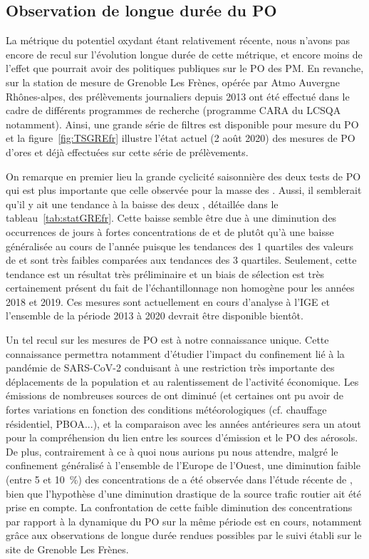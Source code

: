\clearpage
\subsection{Observation de longue durée du PO}%
\label{sub:observation_longue_duree}

La métrique du potentiel oxydant étant relativement récente, nous n'avons pas encore de
recul sur l'évolution longue durée de cette métrique, et encore moins de l'effet que
pourrait avoir des politiques publiques sur le PO des PM. En revanche, sur la station de
mesure de Grenoble Les Frènes, opérée par Atmo Auvergne Rhônes-alpes, des prélèvements
journaliers depuis 2013 ont été effectué dans le cadre de différents programmes de
recherche (programme CARA du LCSQA notamment). Ainsi, une grande série de filtres est
disponible pour mesure du PO et la figure~\ref{fig:TSGREfr} illustre l'état actuel (2
août 2020) des mesures de PO d'ores et déjà effectuées sur cette série de prélèvements.

On remarque en premier lieu la grande cyclicité saisonnière des deux tests de PO 
qui est plus importante que celle observée pour la masse des \PMdix.
Aussi, il semblerait qu'il y ait une tendance à la baisse des deux \POv, détaillée dans le
tableau~\ref{tab:statGREfr}. Cette baisse semble être due à une diminution des occurrences
de jours à fortes concentrations de \PMdix{} et de \POv{} plutôt qu'à une baisse
généralisée au cours de l'année puisque les tendances des 1\iers{} quartiles des valeurs de
\POv{} et \PMdix{} sont très faibles comparées aux tendances des 3\iemes{} quartiles.
Seulement, cette tendance est un résultat très préliminaire et un biais de sélection est
très certainement présent du fait de l'échantillonnage non homogène pour les années 2018
et 2019.
Ces mesures sont actuellement en cours d'analyse à l'IGE et l'ensemble de la période 2013
à 2020 devrait être disponible bientôt.

Un tel recul sur les mesures de PO est à notre connaissance unique. Cette connaissance
permettra notamment d'étudier l'impact du confinement lié à la pandémie de SARS-CoV-2
conduisant à une restriction très importante des déplacements de la population et au
ralentissement de l'activité économique. Les émissions de nombreuses sources de \PMdix{}
ont diminué (et certaines ont pu avoir de fortes variations en fonction des conditions
météorologiques (cf. chauffage résidentiel, PBOA...), et la comparaison avec les années
antérieures sera un atout pour la compréhension du lien entre les sources d'émission et le
PO des aérosols. De plus, contrairement à ce à quoi nous aurions pu nous attendre, malgré
le confinement généralisé à l'ensemble de l'Europe de l'Ouest, une diminution faible
(entre 5 et \SI{10}{\percent}) des concentrations de \PMdc{} a été observée dans l'étude
récente de \cite{menutImpact2020}, bien que l'hypothèse d'une diminution drastique de la
source trafic routier ait été prise en compte.  La confrontation de cette faible diminution
des concentrations \PMdc{} par rapport à la dynamique du PO sur la même période est en
cours, notamment grâce aux observations de longue durée rendues possibles par le suivi
établi sur le site de Grenoble Les Frènes.

